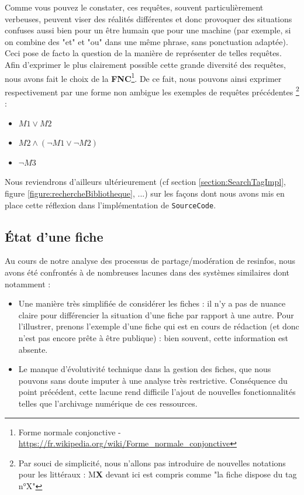 Comme vous pouvez le constater, ces requêtes, souvent particulièrement verbeuses, peuvent viser des réalités différentes et donc provoquer des situations confuses aussi bien pour un être humain que pour une machine (par exemple, si on combine des "et" et "ou" dans une même phrase, sans ponctuation adaptée). 
Ceci pose de facto la question de la manière de représenter de telles requêtes.\\

Afin d'exprimer le plus clairement possible cette grande diversité des requêtes, nous avons fait le choix de la 
\textbf{FNC}\footnote{
    Forme normale conjonctive - 
    \url{https://fr.wikipedia.org/wiki/Forme\_normale\_conjonctive}
}. De ce fait, nous pouvons ainsi exprimer respectivement par une forme non ambigue les exemples de requêtes précédentes \footnote{
    Par souci de simplicité, nous n'allons pas introduire de nouvelles notations pour les littéraux : M\textbf{X} devant ici est compris comme "la fiche dispose du \gls{tag} n°X"
} :

\begin{itemize}
    \item $M1 \lor M2$
    \item $M2 \land (\neg M1 \lor \neg M2)$
    \item $\neg M3$
\end{itemize}

Nous reviendrons d'ailleurs ultérieurement (cf section \ref{section:SearchTagImpl}, figure \ref{figure:rechercheBibliotheque}, ...) sur les façons dont nous avons mis en place cette réflexion dans l'implémentation de \texttt{SourceCode}.

\pagebreak
\subsection*{État d'une \gls{fiche}}

Au cours de notre analyse des processus de partage/modération de \glspl{resinfo}, nous avons été confrontés à de nombreuses lacunes dans des systèmes similaires dont notamment :
\begin{itemize}
    \item Une manière très simplifiée de considérer les \glspl{fiche} : il n'y a pas de nuance claire pour différencier la situation d'une \gls{fiche} par rapport à une autre. Pour l'illustrer, prenons l'exemple d'une \gls{fiche} qui est en cours de rédaction (et donc n'est pas encore prête à être publique) : bien souvent, cette information est absente.
    \item Le manque d'évolutivité technique dans la gestion des \glspl{fiche}, que nous pouvons sans doute imputer à une analyse très restrictive. Conséquence du point précédent, cette lacune rend difficile l'ajout de nouvelles fonctionnalités telles que l'archivage numérique de ces ressources. 
\end{itemize}

